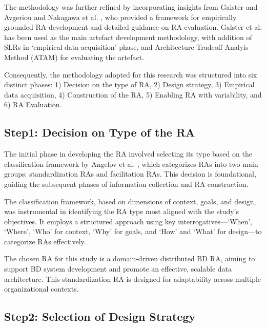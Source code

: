 \documentclass[review]{elsarticle}
\begin{document}
The methodology was further refined by incorporating insights from Galster and Avgeriou \cite{galster2011empirically} and Nakagawa et al. \cite{nakagawa2014consolidating}, who provided a framework for empirically grounded RA development and detailed guidance on RA evaluation. Galster et al. \cite{galster2011empirically} has been used as the main artefact development methodology, with addition of SLRs in `empirical data acquisition' phase, and Architecture Tradeoff Analyis Method (ATAM) for evaluating the artefact.


Consequently, the methodology adopted for this research was structured into six distinct phases: 1) Decision on the type of RA, 2) Design strategy, 3) Empirical data acquisition, 4) Construction of the RA, 5) Enabling RA with variability, and 6) RA Evaluation.




\subsection{Step1: Decision on Type of the RA}

The initial phase in developing the RA involved selecting its type based on the classification framework by Angelov et al. \cite{angelov2009classification}, which categorizes RAs into two main groups: standardization RAs and facilitation RAs. This decision is foundational, guiding the subsequent phases of information collection and RA construction. 

The classification framework, based on dimensions of context, goals, and design, was instrumental in identifying the RA type most aligned with the study's objectives. It employs a structured approach using key interrogatives—‘When’, ‘Where’, ‘Who’ for context, ‘Why’ for goals, and ‘How’ and ‘What’ for design—to categorize RAs effectively.

The chosen RA for this study is a domain-driven distributed BD RA, aiming to support BD system development and promote an effective, scalable data architecture. This standardization RA is designed for adaptability across multiple organizational contexts.


\subsection{Step2: Selection of Design Strategy}
\end{document}
